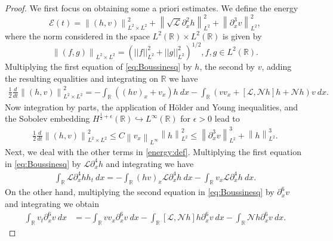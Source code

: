 \documentclass[10pt,a4paper]{amsart}
\newcommand{\RR}{\mathbb R}
\newcommand{\norm}[1]{\left\| #1 \right\|}
\newcommand{\pa}{\partial}
\begin{document}
\begin{proof}
We first focus on obtaining some a priori estimates.
We define the energy
\begin{equation}\label{energy:def}
\mathcal{E}(t)=\norm{(h,v)}_{L^{2}\times L^2}^{2} 	+\norm{\sqrt{\mathscr{L}}\pa_{x}^{2}h}_{L^{2}}^{2}+ \norm{\pa_{x}^{3}v}_{L^{2}}^{2},
\end{equation}
where the norm considered in the space $L^{2}(\mathbb{R})\times L^{2}(\mathbb{R})$ is given by
$$\norm{(f,g)}_{L^{2}\times L^2}=\left(||f||_{L^{2}}^{2}+||g||_{L^{2}}^{2}\right)^{1/2}, f,g\in L^{2}(\mathbb{R}).$$
Multiplying the first equation of \eqref{eq:Boussinesq} by $h$, the second by $v$, adding the resulting equalities and integrating on $\mathbb{R}$ we have
\begin{align*}
\frac{1}{2}\frac{d}{dt}\norm{(h,v)}_{L^{2}\times L^2}^{2}=-\int_{\RR} \left((hv)_{x}+v_{x}\right) h \  dx- \int_{\RR} \left(vv_{x}+[\mathscr{L}, \mathscr{N}h]h+\mathscr{N}h \right) v \  dx.
\end{align*}
Now integration by parts, the application of H\"older and Young  inequalities, and the Sobolev embedding $H^{\frac{1}{2}+\epsilon}(\RR)\hookrightarrow L^{\infty}(\RR)$ for $\epsilon>0$ lead to 
\begin{align}\label{L2:estimate:system3}
\frac{1}{2}\frac{d}{dt}\norm{(h,v)}_{L^{2}\times L^2}^{2}\leq C \norm{v_x}_{L^{\infty}}\norm{h}^{2}_{L^{2}} \leq \norm{\pa_{x}^{3}v}^{3}_{L^2}+\norm{h}_{L^{2}}^{3}.
\end{align}
Next, we deal with the other terms in \eqref{energy:def}. Multiplying the first equation in \eqref{eq:Boussinesq} by $ \mathscr{L}\partial_{x}^{4}h$ and integrating we have 
\begin{align}\label{eq:Lh}
\int_{\RR} \mathscr{L}\pa_{x}^{4}h h_{t} \  dx=-\int_{\RR}(hv)_{x} \mathscr{L}\pa_{x}^{4}h \ dx - \int_{\RR} v_{x} \mathscr{L}\pa_{x}^{4}h \  dx.
\end{align}
On the other hand, multiplying the second equation in  \eqref{eq:Boussinesq} by $\pa_{x}^{6}v$ and integrating we obtain
\begin{align}\label{eq:H3v}
\int_{\RR} v_{t} \pa_{x}^{6}v\  dx &=-\int_{\RR}vv_{x} \pa_{x}^{6}v \ dx - \int_{\RR}[\mathscr{L}, \mathscr{N}h] h \pa_{x}^{6}v  \ dx - \int_{\RR} \mathscr{N}h \pa_{x}^{6} v \  dx .

\end{align}
\end{proof}
\end{document}

